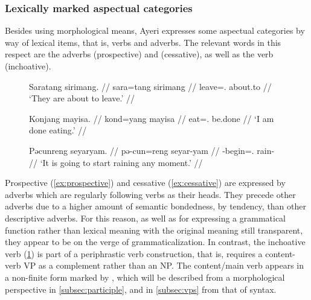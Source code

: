 \subsubsection{Lexically marked aspectual categories}

Besides using morphological means, Ayeri expresses some aspectual categories by
way of lexical items, that is, verbs and adverbs. The relevant words in this
respect are the adverbs  (prospective) and
 (cessative), as well as 
the verb  (inchoative).

\begin{figure}[h]
\pex
\a\label{ex:prospective}
\begingl
	\gla Saratang sirimang. //
	\glb sara=tang sirimang //
	\glc leave=\TplM{}.\Aarg{} about.to //
	\glft `They are about to leave.' //
\endgl

\a\label{ex:cessative}
\begingl
	\gla Konjang mayisa. //
	\glb kond=yang mayisa //
	\glc eat=\Fsg.\Aarg{} be.done //
	\glft `I am done eating.' //
\endgl

\a\label{ex:inchoative}
\begingl
	\gla Pəcunreng seyaryam. //
	\glb pə-cun=reng seyar-yam //
	\glc \NFut{}-begin=\TsgI{}.\Aarg{} rain-\Ptcp{} //
	\glft `It is going to start raining any moment.' //
\endgl
\xe
\end{figure}

Prospective  (\ref{ex:prospective}) and cessative
 (\ref{ex:cessative}) are expressed by adverbs which are
regularly following verbs as their heads. They precede other adverbs due to a
higher amount of semantic bondedness, by tendency, than other descriptive
adverbs. For this reason, as well as for expressing a grammatical function
rather than lexical meaning with the original meaning still transparent, they
appear to be on the verge of grammaticalization. In contrast, the inchoative
verb  (\ref{ex:inchoative}) is part of a periphrastic verb
construction, that is,  requires a content-verb VP as a
complement rather than an NP. The content/main verb appears in a non-finite
form marked by , which will be described from a morphological
perspective in \autoref{subsec:participle}, and in \autoref{subsec:vps} from
that of syntax.

